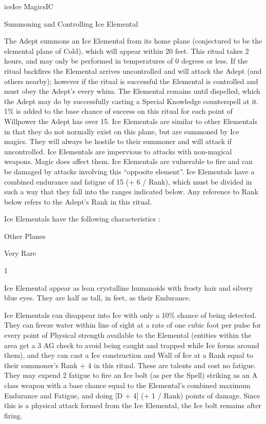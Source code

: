 \begin{college}[1.5]{ice}{Ice Magics}{IC}
\begin{ritual}[R-2]{Summoning and Controlling Ice Elemental}
\begin{effects}
The Adept summons an Ice Elemental from its home plane (conjectured to
be the elemental plane of Cold), which will appear within 20
feet. This ritual takes 2 hours, and may only be performed in
temperatures of 0 degrees or less. If the ritual backfires the
Elemental arrives uncontrolled and will attack the Adept (and others
nearby); however if the ritual is successful the Elemental is
controlled and must obey the Adept's every whim. The Elemental remains
until dispelled, which the Adept may do by successfully casting a
Special Knowledge counterspell at it. 1\% is added to the base chance
of success on this ritual for each point of Willpower the Adept has
over 15. Ice Elementals are similar to other Elementals in that they
do not normally exist on this plane, but are summoned by Ice
magics. They will always be hostile to their summoner and will attack
if uncontrolled. Ice Elementals are impervious to attacks with
non-magical weapons. Magic does affect them. Ice Elementals are
vulnerable to fire and can be damaged by attacks involving this
``opposite element''. Ice Elementals have a combined endurance and
fatigue of 15 (+ 6 / Rank), which must be divided in such a way that
they fall into the ranges indicated below. Any reference to Rank below
refers to the Adept's Rank in this ritual.

Ice Elementals have the following characteristics :
\begin{Description}
\item[Habitat] Other Planes
\item[Frequency] Very Rare
\item[Number] 1
\item[Description] Ice Elemental appear as lean crystalline humanoids
with frosty hair and silvery blue eyes. They are half as tall, in
feet, as their Endurance.

\item[Talents, Skills and Magic] Ice Elementals can disappear into Ice
with only a 10\% chance of being detected. They can freeze water
within line of sight at a rate of one cubic foot per pulse for every
point of Physical strength available to the Elemental (entities within
the area get a 3 \x AG check to avoid being caught and trapped while
Ice forms around them), and they can cast a Ice construction and Wall
of Ice at a Rank equal to their summoner's Rank + 4 in this ritual.
These are talents and cost no fatigue. They may expend 2 fatigue to
fire an Ice bolt (as per the Spell) striking as an A class weapon with
a base chance equal to the Elemental's combined maximum Endurance and
Fatigue, and doing [D + 4] (+ 1 / Rank) points of damage. Since this
is a physical attack formed from the Ice Elemental, the Ice bolt
remains after firing.


\end{Description}
\end{effects}
\end{ritual}
\end{college}
